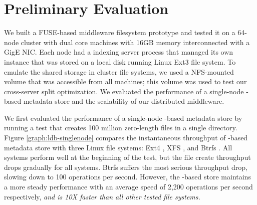 \section{Preliminary Evaluation}

We built a FUSE-based middleware filesystem prototype and tested it on a
64-node cluster with dual core machines with 16GB memory interconnected with a 
GigE NIC.
Each node had a \giga{} indexing server process that managed its own \ldb instance 
that was stored on a local disk running Linux Ext3 file system.
To emulate the shared storage in cluster file systems, we used a NFS-mounted
volume that was accessible from all machines; this volume was used to 
test our cross-server \ldb split optimization.
We evaluated the performance of a single-node \ldb-based metadata store and
the scalability of our distributed middleware.

We first evaluated the performance of a single-node \ldb-based metadata store
by running a test that creates 100 million zero-length files in a single
directory.
Figure \ref{graph:ldb-singlenode} compares the instantaneous throughput of \ldb-based metadata 
store with three Linux file systems: Ext4 \citep{Ext4}, XFS \citep{XFS}, and
Btrfs \citep{BTRFS}.
All systems perform well at the beginning of the test, but the file create
throughput drops gradually for all systems. 
Btrfs suffers the most serious throughput drop, slowing down to 100 operations 
per second. However, the \ldb-based store maintains a more steady performance 
with an average speed of 2,200 operations per second respectively,
\textit{and is 10X faster than all other tested file systems.}


